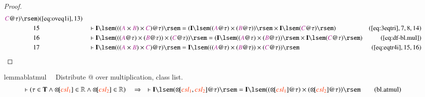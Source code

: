 \begin{proof}
\begin{align}
      \mc{C} @ \tau ) \rsem
      )&(\mbox{\ref{eq:oveq1i}},13)\notag
  \\ 15 &&  & \vdash \mathbf{I} \lsem ( ( ( \mc{A} \times \mc{B} ) \times \mc{C}
      ) @ \tau ) \rsem = ( \mathbf{I} \lsem ( ( \mc{A} @
      \tau ) \times ( \mc{B} @ \tau ) ) \rsem \times
      \mathbf{I} \lsem ( \mc{C} @ \tau ) \rsem
      )&(\mbox{\ref{eq:3eqtri}},7,8,14)\notag
  \\ 16 &&  & \vdash \mathbf{I} \lsem ( ( ( \mc{A} @ \tau ) \times ( \mc{B} @
      \tau ) ) \times ( \mc{C} @ \tau ) ) \rsem = (
      \mathbf{I} \lsem ( ( \mc{A} @ \tau ) \times ( \mc{B} @
      \tau ) ) \rsem \times \mathbf{I} \lsem ( \mc{C} @ \tau
      ) \rsem )&(\mbox{\ref{eq:df-bl.mul}})\notag
  \\ 17 &&  & \vdash \mathbf{I} \lsem ( ( ( \mc{A} \times \mc{B} ) \times \mc{C}
      ) @ \tau ) \rsem = \mathbf{I} \lsem ( ( ( \mc{A} @
      \tau ) \times ( \mc{B} @ \tau ) ) \times ( \mc{C} @
      \tau ) ) \rsem&(\mbox{\ref{eq:eqtr4i}},15,16)\notag
\end{align}
\end{proof}

\begin{restatable}{lemma}{blatmul}~~ Distribute @ over multiplication, class
list.
\begin{align}
\vdash ( \tau \in \mathbf{T} \wedge {\otimes\hspace{-1pt}[} \msc{csl_1} ] \in
    \mathbb{R} \wedge {\otimes\hspace{-1pt}[} \msc{csl_2} ] \in \mathbb{R}
    )\quad\Rightarrow\quad \vdash \mathbf{I} \lsem ( {\otimes\hspace{-1pt}[}
    \msc{csl_1} , \msc{csl_2} ] @ \tau ) \rsem = \mathbf{I} \lsem ( (
    {\otimes\hspace{-1pt}[} \msc{csl_1} ] @ \tau ) \times (
    {\otimes\hspace{-1pt}[} \msc{csl_2} ] @ \tau ) )
    \rsem\label{eq:bl.atmul}\tag{bl.atmul}
\end{align}
\end{restatable}

